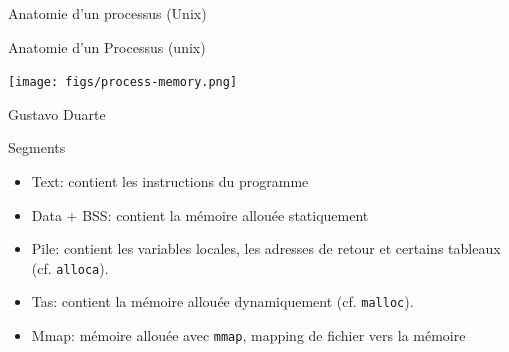 \documentclass[11pt]{beamer}
\begin{document}
\begin{slide}{Anatomie d'un processus (Unix)}
\end{slide}

\begin{frame}[plain]{Anatomie d'un Processus (unix)}

\centering

\texttt{[image: figs/process-memory.png]}

Gustavo Duarte

\end{frame}

\begin{frame}{Segments}

\begin{itemize}
\itemsep1pt\parskip0pt
\item
  Text: contient les instructions du programme
\item
  Data + BSS: contient la mémoire allouée statiquement
\item
  Pile: contient les variables locales, les adresses de retour et
  certains tableaux (cf. \texttt{alloca}).
\item
  Tas: contient la mémoire allouée dynamiquement (cf. \texttt{malloc}).
\item
  Mmap: mémoire allouée avec \texttt{mmap}, mapping de fichier vers la
  mémoire
\end{itemize}

\end{frame}
\end{document}
